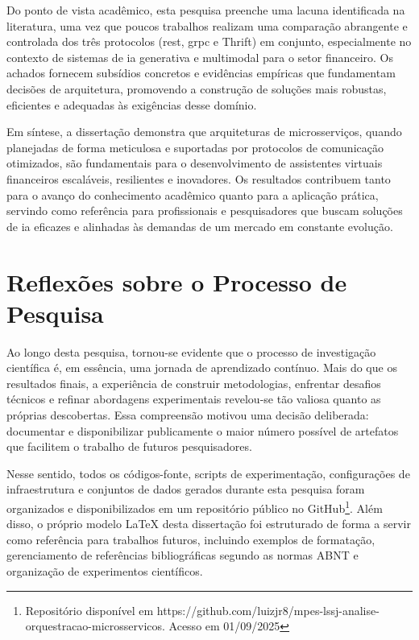 Do ponto de vista acadêmico, esta pesquisa preenche uma lacuna identificada na literatura, uma vez que poucos trabalhos realizam uma comparação abrangente e controlada dos três protocolos (\gls{rest}, \gls{grpc} e Thrift) em conjunto, especialmente no contexto de sistemas de \gls{ia} generativa e multimodal para o setor financeiro. Os achados fornecem subsídios concretos e evidências empíricas que fundamentam decisões de arquitetura, promovendo a construção de soluções mais robustas, eficientes e adequadas às exigências desse domínio.

Em síntese, a dissertação demonstra que arquiteturas de microsserviços, quando planejadas de forma meticulosa e suportadas por protocolos de comunicação otimizados, são fundamentais para o desenvolvimento de assistentes virtuais financeiros escaláveis, resilientes e inovadores. Os resultados contribuem tanto para o avanço do conhecimento acadêmico quanto para a aplicação prática, servindo como referência para profissionais e pesquisadores que buscam soluções de \acrfull{ia} eficazes e alinhadas às demandas de um mercado em constante evolução.

\section{Reflexões sobre o Processo de Pesquisa}

Ao longo desta pesquisa, tornou-se evidente que o processo de investigação científica é, em essência, uma jornada de aprendizado contínuo. Mais do que os resultados finais, a experiência de construir metodologias, enfrentar desafios técnicos e refinar abordagens experimentais revelou-se tão valiosa quanto as próprias descobertas. Essa compreensão motivou uma decisão deliberada: documentar e disponibilizar publicamente o maior número possível de artefatos que facilitem o trabalho de futuros pesquisadores.

Nesse sentido, todos os códigos-fonte, scripts de experimentação, configurações de infraestrutura e conjuntos de dados gerados durante esta pesquisa foram organizados e disponibilizados em um repositório público no GitHub\footnote{Repositório disponível em https://github.com/luizjr8/mpes-lssj-analise-orquestracao-microsservicos. Acesso em 01/09/2025}. Além disso, o próprio modelo LaTeX desta dissertação foi estruturado de forma a servir como referência para trabalhos futuros, incluindo exemplos de formatação, gerenciamento de referências bibliográficas segundo as normas ABNT e organização de experimentos científicos.

